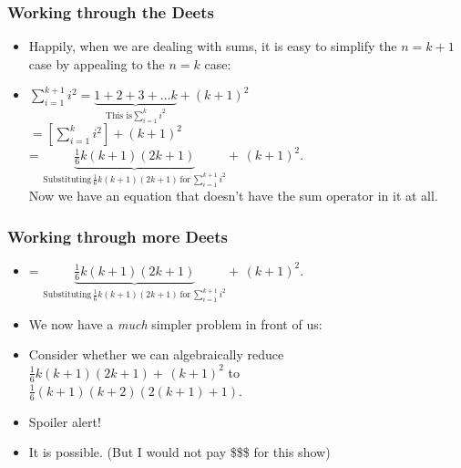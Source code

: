  \begin{frame}
\frametitle{Working through the Deets}

\begin{itemize}
\item Happily, when we are dealing with sums, it is easy to simplify the $n=k+1$ case by appealing to the $n=k$ case:

\item[]  $\displaystyle\sum_{i=1}^{k+1} i^2 = \underbrace{1+2+3+ \ldots k}_{\text{This is} \sum_{i=1}^k i^2}  + (k+1)^2$\\[3ex]

\noindent $= [\sum_{i=1}^k i^2] + (k+1)^2$\\[3ex]

\noindent = $ \underbrace{\frac{1}{6}k(k+1)(2k+1)}_{\text{Substituting}\, {\frac{1}{6}k(k+1)(2k+1) \,\text{for}\, \sum_{i=1}^{k+1} i^2 }}+\, (k+1)^2$.\\[2ex]

Now we have an equation that doesn't have the sum operator in it at all. 

\end{itemize} 
\end{frame}

 \begin{frame}
\frametitle{Working through more Deets}

\begin{itemize}

\item[] \noindent = $ \underbrace{\frac{1}{6}k(k+1)(2k+1)}_{\text{Substituting}\, {\frac{1}{6}k(k+1)(2k+1) \,\text{for}\, \sum_{i=1}^{k+1} i^2 }}+\, (k+1)^2$.\\[2ex]

\item We now have a {\it{much}} simpler problem in front of us: 

\item Consider whether we can algebraically reduce $\frac{1}{6}k(k+1)(2k+1) +\, (k+1)^2 $ to\\[2ex] $\frac{1}{6}(k+1)(k+2)(2(k+1)+1)$.

\item Spoiler alert!

\item It is possible. (But I would not pay \$\$\$ for this show)

\end{itemize} 
\end{frame}



